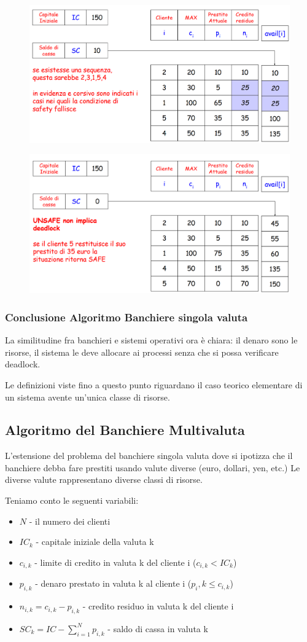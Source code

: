 \begin{figure} [h]
    \centering
    \includegraphics[width=0.7\linewidth]{Images/Screenshot 2025-01-15 114534.png}
\end{figure}

\begin{figure} [h]
    \centering
    \includegraphics[width=0.7\linewidth]{Images/Screenshot 2025-01-15 114907.png}
\end{figure}

\subsubsection{Conclusione Algoritmo Banchiere singola valuta}
La similitudine fra banchieri e sistemi operativi ora è chiara: il denaro sono le risorse, il sistema le deve allocare ai processi senza che si possa verificare deadlock.

Le definizioni viste fino a questo punto riguardano il caso teorico elementare di un sistema avente un'unica classe di risorse.
\newpage
\subsection{Algoritmo del Banchiere Multivaluta}
L'estensione del problema del banchiere singola valuta dove si ipotizza che il banchiere debba fare prestiti usando valute diverse (euro, dollari, yen, etc.)
Le diverse valute rappresentano diverse classi di risorse.

Teniamo conto le seguenti variabili:
\begin{itemize}
    \item $N$ - il numero dei clienti
    \item $IC_k$ - capitale iniziale della valuta k
    \item $c_{i,k}$ - limite di credito in valuta k del cliente i ($c_{i,k} < IC_k$)
    \item $p_{i,k}$ - denaro prestato in valuta k al cliente i ($p_i,k \le c_{i,k}$)
    \item $n_{i,k} =c_{i,k} - p_{i,k}$ - credito residuo in valuta k del cliente i
    \item $SC_k = IC - \sum_{i=1}^{N} p_{i,k}$ - saldo di cassa in valuta k 
\end{itemize}

